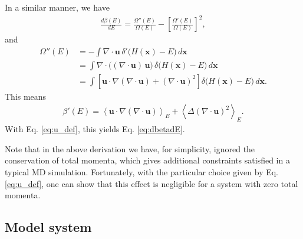 \documentclass[reprint]{revtex4-1}
\begin{document}
In a similar manner, we have
%
\begin{align*}
  \frac
  {
    d \beta(E)
  }
  {
    d E
  }
  =
  \frac
  {
    \Omega''(E)
  }
  {
    \Omega(E)
  }
  -
  \left[
    \frac
    {
      \Omega'(E)
    }
    {
      \Omega(E)
    }
  \right]^2
  ,
\end{align*}
%
and
%
\begin{align*}
  \Omega''(E)
  &= -\int \nabla \cdot \mathbf u \,
     \delta'\bigl( H(\mathbf x) - E \bigr) \, d\mathbf x
  \\
  &= \int
     \nabla \cdot \bigl( (\nabla \cdot \mathbf u) \, \mathbf u \bigr) \,
     \delta\bigl( H(\mathbf x) - E \bigr) \, d\mathbf x
  \\
  &= \int
     \left[
     \mathbf u \cdot \nabla (\nabla \cdot \mathbf u)
     +
     (\nabla \cdot \mathbf u)^2
     \right]
     \delta\bigl( H(\mathbf x) - E \bigr) \, d\mathbf x
  .
\end{align*}
%
This means
%
\begin{align*}
  \beta'(E)
  =
  \left\langle
     \mathbf u \cdot \nabla (\nabla \cdot \mathbf u)
  \right\rangle_E
  +
  \left\langle
    \Delta (\nabla \cdot \mathbf u)^2
  \right\rangle_E
  .
\end{align*}
%
With Eq. \eqref{eq:u_def},
this yields Eq. \eqref{eq:dbetadE}.

Note that in the above derivation
we have, for simplicity, ignored the conservation
of total momenta\cite{shirts2006, uline2008},
which gives additional constraints satisfied in a typical MD simulation.
%
Fortunately, with the particular choice given by Eq. \eqref{eq:u_def},
one can show that this effect is negligible for a system
with zero total momenta\cite{uline2008}.



\subsection{Model system}
\end{document}
